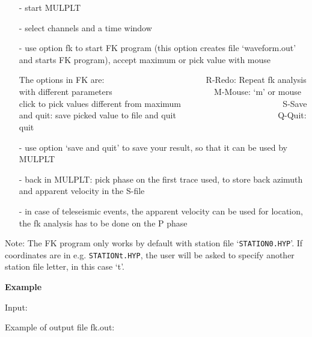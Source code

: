 \begin{itemize}
\item[-]
start MULPLT 
\item[-]
select channels and a time window 
\item[-]
use option fk to start FK program (this option creates file `waveform.out' and starts FK program), 
accept maximum or pick value with mouse 

The options in FK are: \newline
\verb|                       |R-Redo: Repeat fk analysis with different parameters \newline
\verb|                       |M-Mouse: `m' or mouse click to pick values different from maximum \newline
\verb|                       |S-Save and quit: save picked value to file and quit \newline
\verb|                       |Q-Quit: quit 

\item[-]
use option `save and quit' to save your result, so that it can be used by MULPLT 
\item[-]
back in MULPLT: pick phase on the first trace used, to store back azimuth 
and apparent velocity in the S-file 
\item[-]
in case of teleseismic events, the apparent velocity can be used for location, the fk analysis has to be done on the P phase 
\end{itemize}

Note: The FK program only works by default  with station file `\texttt{STATION0.HYP}'. If coordinates are in e.g. \texttt{STATIONt.HYP}, the user will be asked to specify another station file letter, in this case `t'. 

\textbf{Example}

Input: 



Example of output file fk.out: 



